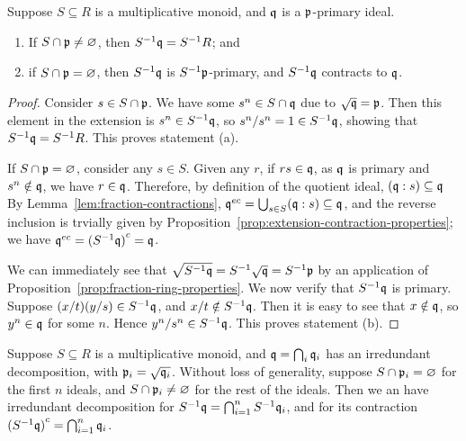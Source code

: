 \begin{proposition}\label{prop:fraction-primary}
    Suppose \(S \subseteq R\) is a multiplicative monoid,
    and \(\mathfrak{q}\) is a \(\mathfrak{p}\)-primary ideal.
    \begin{enumerate}[label={(\alph*)}, itemsep=0mm]
        \item If \(S\cap\mathfrak{p} \neq \varnothing\), then \(S^{-1}\mathfrak{q} = S^{-1}R\); and
        \item if \(S\cap\mathfrak{p} = \varnothing\), then \(S^{-1}\mathfrak{q}\) is \(S^{-1}\mathfrak{p}\)-primary,
            and \(S^{-1}\mathfrak{q}\) contracts to \(\mathfrak{q}\).
    \end{enumerate}
\end{proposition}
\begin{proof}
    Consider \(s \in S\cap\mathfrak{p}\).
    We have some \(s^n \in S\cap\mathfrak{q}\) due to \(\sqrt{\mathfrak{q}} = \mathfrak{p}\).
    Then this element in the extension is \(s^n \in S^{-1}\mathfrak{q}\),
    so \(s^n/s^n = 1 \in S^{-1}\mathfrak{q}\),
    showing that \(S^{-1}\mathfrak{q} = S^{-1}R\).
    This proves statement (a).

    If \(S\cap\mathfrak{p} = \varnothing\), consider any \(s \in S\).
    Given any \(r\), if \(rs \in \mathfrak{q}\),
    as \(\mathfrak{q}\) is primary and \(s^n \notin \mathfrak{q}\),
    we have \(r \in \mathfrak{q}\).
    Therefore, by definition of the quotient ideal, \((\mathfrak{q}:s) \subseteq \mathfrak{q}\)
    By Lemma~\ref{lem:fraction-contractions},
    \(\mathfrak{q}^{ec} = \bigcup_{s \in S} (\mathfrak{q}:s) \subseteq \mathfrak{q}\),
    and the reverse inclusion is trvially given by Proposition~\ref{prop:extension-contraction-properties};
    we have \(\mathfrak{q}^{ec} = {(S^{-1}\mathfrak{q})}^c = \mathfrak{q}\).

    We can immediately see that \(\sqrt{S^{-1}\mathfrak{q}} = S^{-1}\sqrt{\mathfrak{q}} = S^{-1}\mathfrak{p}\)
    by an application of Proposition~\ref{prop:fraction-ring-properties}.
    We now verify that \(S^{-1}\mathfrak{q}\) is primary.
    Suppose \((x/t)(y/s) \in S^{-1}\mathfrak{q}\), and \(x/t \notin S^{-1}\mathfrak{q}\).
    Then it is easy to see that \(x \notin \mathfrak{q}\),
    so \(y^n \in \mathfrak{q}\) for some \(n\).
    Hence \(y^n/s^n \in S^{-1}\mathfrak{q}\).
    This proves statement (b).
\end{proof}
\begin{proposition}\label{prop:fraction-decomposition}
    Suppose \(S \subseteq R\) is a multiplicative monoid,
    and \(\mathfrak{q} = \bigcap_i \mathfrak{q}_i\) has an irredundant decomposition,
    with \(\mathfrak{p}_i = \sqrt{\mathfrak{q}_i}\).
    Without loss of generality, suppose \(S \cap \mathfrak{p}_i = \varnothing\) for the first \(n\) ideals,
    and \(S \cap \mathfrak{p}_i \neq \varnothing\) for the rest of the ideals.
    Then we an have irredundant decomposition for \(S^{-1}\mathfrak{q} = \bigcap_{i=1}^n S^{-1}\mathfrak{q}_i\),
    and for its contraction \({(S^{-1}\mathfrak{q})}^c = \bigcap_{i=1}^n \mathfrak{q}_i\).
\end{proposition}
